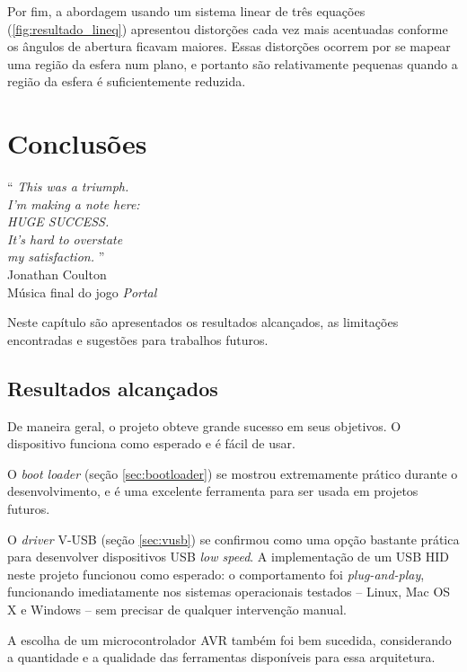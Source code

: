 \documentclass[brazil,pagestart=firstchapter]{abnt}
\begin{document}
Por fim, a abordagem usando um sistema linear de três equações
(\ref{fig:resultado_lineq}) apresentou distorções cada vez mais acentuadas
conforme os ângulos de abertura ficavam maiores. Essas distorções ocorrem
por se mapear uma região da esfera num plano, e portanto são relativamente
pequenas quando a região da esfera é suficientemente reduzida.


\chapter{Conclusões}
\label{cap:conclusoes}


\vfill{}
\begin{flushright}{}
``\emph{
	This was a triumph.    \\
	I'm making a note here:\\
	HUGE SUCCESS.          \\
	It's hard to overstate \\
	my satisfaction.
}''\\
{\small Jonathan Coulton} \\
{\small Música final do jogo \textit{Portal}}
\end{flushright}{\small \par}
\vfill{}

Neste capítulo são apresentados os resultados alcançados, as limitações
encontradas e sugestões para trabalhos futuros.
\newpage


\section{Resultados alcançados}
\label{sec:resultados}

De maneira geral, o projeto obteve grande sucesso em seus objetivos. O
dispositivo funciona como esperado e é fácil de usar.

O \textit{boot loader} (seção \ref{sec:bootloader}) se mostrou extremamente
prático durante o desenvolvimento, e é uma excelente ferramenta para ser
usada em projetos futuros.

O \textit{driver} V-USB (seção \ref{sec:vusb}) se confirmou como uma opção
bastante prática para desenvolver dispositivos \ac{USB} \textit{low speed}.
A implementação de um \ac{USB} \ac{HID} neste projeto funcionou como
esperado: o comportamento foi \textit{plug-and-play}, funcionando
imediatamente nos sistemas operacionais testados -- Linux, Mac OS X e
Windows -- sem precisar de qualquer intervenção manual.

A escolha de um microcontrolador AVR também foi bem sucedida, considerando a
quantidade e a qualidade das ferramentas disponíveis para essa arquitetura.
\end{document}
